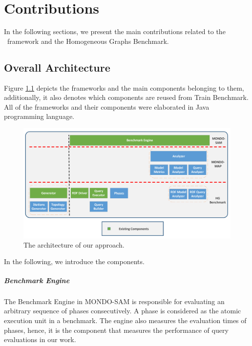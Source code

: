 \chapter{Contributions}\label{chapter:contribution}

In the following sections, we present the main contributions related to the \framework~framework and the Homogeneous Graphs Benchmark.

\section{Overall Architecture}

Figure \ref{fig:architecture} depicts the frameworks and the main components belonging to them, additionally, it also denotes which components are reused from Train Benchmark. All of the frameworks and their components were elaborated in Java programming language.

\begin{figure}[!ht]
	\centering
	\includegraphics[width=150mm, keepaspectratio]{figures/architecture.pdf}
	\caption{The architecture of our approach.}
	\label{fig:architecture}
\end{figure}

In the following, we introduce the components.

\paragraph{Benchmark Engine}
The \textsf{Benchmark Engine} in MONDO-SAM is responsible for evaluating an arbitrary sequence of phases consecutively. A phase is considered as the atomic execution unit in a benchmark. The engine also measures the evaluation times of phases, hence, it is the component that measures the performance of query evaluations in our work.

